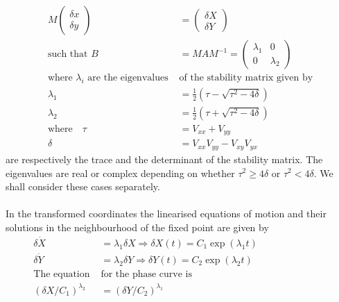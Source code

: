 \begin{align*}
M\left(\begin{array}{l}
\delta x \\
\delta y
\end{array}\right)&=\left(\begin{array}{l}
\delta X \\
\delta Y
\end{array}\right)\\
\text{such that }B&=M A M^{-1}=\left(\begin{array}{cc}
\lambda_{1} & 0 \\
0 & \lambda_{2}
\end{array}\right)\\
\text{where $\lambda_{i}$ are the eigenvalues }&\text{of the stability matrix given by}\\
\lambda_{1}&=\frac{1}{2}\left(\tau-\sqrt{\tau^{2}-4 \delta}\right) \\
\lambda_{2}&=\frac{1}{2}\left(\tau+\sqrt{\tau^{2}-4 \delta}\right)\\
\text{where}\quad\tau&=V_{x x}+V_{y y} \\
\delta&=V_{x x} V_{y y}-V_{x y} V_{y x}
\end{align*}
are respectively the trace and the determinant of the stability matrix. The eigenvalues are real or complex depending on whether $\tau^{2} \geq 4 \delta$ or $\tau^{2}<4 \delta .$ We shall consider these cases separately.\\\\
In the transformed coordinates the linearised equations of motion and their solutions in the neighbourhood of the fixed point are given by
$$
\begin{aligned}
\delta \dot{X} &=\lambda_{1} \delta X \Rightarrow \delta X(t)=C_{1} \exp \left(\lambda_{1} t\right) \hspace{3cm}\\
\delta \dot{Y} &=\lambda_{2} \delta Y \Rightarrow \delta Y(t)=C_{2} \exp \left(\lambda_{2} t\right)\\
\text{The equation  }&\text{for the phase curve is}\\
\left(\delta X / C_{1}\right)^{\lambda_{2}}&=\left(\delta Y / C_{2}\right)^{\lambda_{1}}
\end{aligned}
$$
